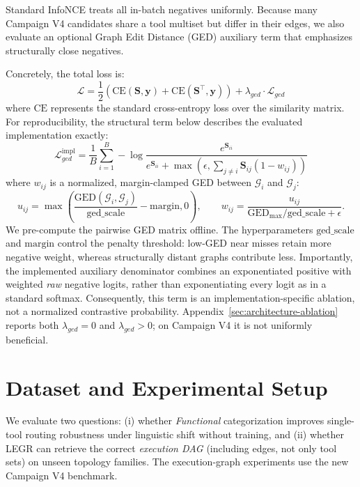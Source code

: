 \documentclass{article}
\begin{document}
Standard InfoNCE treats all in-batch negatives uniformly. Because many Campaign V4 candidates share a tool multiset but differ in their edges, we also evaluate an optional Graph Edit Distance (GED) auxiliary term that emphasizes structurally close negatives.

Concretely, the total loss is:
\begin{equation}
\mathcal{L} = \frac{1}{2} \left( \text{CE}(\mathbf{S}, \mathbf{y}) + \text{CE}(\mathbf{S}^\top, \mathbf{y}) \right) + \lambda_{ged} \cdot \mathcal{L}_{ged}
\end{equation}
where $\text{CE}$ represents the standard cross-entropy loss over the similarity matrix. For reproducibility, the structural term below describes the evaluated implementation exactly:
\begin{equation}
\mathcal{L}_{ged}^{\mathrm{impl}} = \frac{1}{B} \sum_{i=1}^B -\log \frac{e^{\mathbf{S}_{ii}}}{e^{\mathbf{S}_{ii}} + \max\!\left(\epsilon,\sum_{j \neq i}\mathbf{S}_{ij}(1-w_{ij})\right)}
\end{equation}
where $w_{ij}$ is a normalized, margin-clamped GED between $\mathcal{G}_i$ and $\mathcal{G}_j$:
\begin{equation}
u_{ij}=\max\!\left(\frac{\mathrm{GED}(\mathcal{G}_i,\mathcal{G}_j)}{\mathrm{ged\_scale}}-\mathrm{margin},0\right), \qquad
w_{ij}=\frac{u_{ij}}{\mathrm{GED}_{\max}/\mathrm{ged\_scale}+\epsilon}.
\end{equation}
We pre-compute the pairwise GED matrix offline. The hyperparameters $\text{ged\_scale}$ and $\text{margin}$ control the penalty threshold: low-GED near misses retain more negative weight, whereas structurally distant graphs contribute less. Importantly, the implemented auxiliary denominator combines an exponentiated positive with weighted \emph{raw} negative logits, rather than exponentiating every logit as in a standard softmax. Consequently, this term is an implementation-specific ablation, not a normalized contrastive probability. Appendix~\ref{sec:architecture-ablation} reports both $\lambda_{ged}=0$ and $\lambda_{ged}>0$; on Campaign V4 it is not uniformly beneficial.



\section{Dataset and Experimental Setup}

We evaluate two questions: (i) whether \emph{Functional} categorization improves single-tool routing robustness under linguistic shift without training, and (ii) whether LEGR can retrieve the correct \emph{execution DAG} (including edges, not only tool sets) on unseen topology families. The execution-graph experiments use the new Campaign V4 benchmark.
\end{document}
